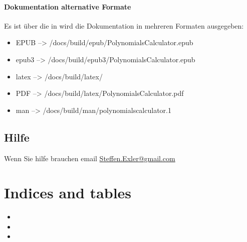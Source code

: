 \documentclass[letterpaper,10pt,ngerman]{sphinxmanual}
\begin{document}
\subsubsection{Dokumentation alternative Formate}
\label{docs:dokumentation-alternative-formate}
Es ist über die  in  wird die Dokumentation in mehreren Formaten ausgegeben:
\begin{itemize}
\item {} 
EPUB --\textgreater{} /docs/build/epub/PolynomialsCalculator.epub

\item {} 
epub3 --\textgreater{} /docs/build/epub3/PolynomialsCalculator.epub

\item {} 
latex --\textgreater{} /docs/build/latex/

\item {} 
PDF --\textgreater{} /docs/build/latex/PolynomialsCalculator.pdf

\item {} 
man --\textgreater{} /docs/build/man/polynomialscalculator.1

\end{itemize}


\section{Hilfe}
\label{help:hilfe}\label{help::doc}
Wenn Sie hilfe brauchen email \href{mailto:Steffen.Exler@gmail.com}{Steffen.Exler@gmail.com}


\chapter{Indices and tables}
\label{index:indices-and-tables}\begin{itemize}
\item {} 

\item {} 

\item {} 

\end{itemize}



\renewcommand{\indexname}{Stichwortverzeichnis}
\printindex
\end{document}
